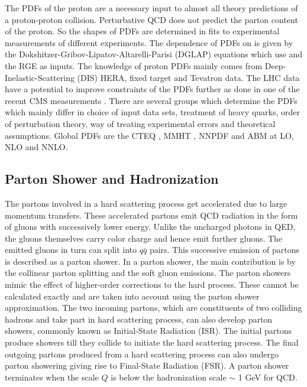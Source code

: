 The PDFs of the proton are a necessary input to almost all theory predictions of a proton-proton collision. Perturbative QCD does not predict the parton content of the proton. So the shapes of PDFs are determined in fits to experimental measurements of different experiments. The dependence of PDFs on \muf is given by the Dokshitzer-Gribov-Lipatov-Altarelli-Parisi (DGLAP) \cite{Gribov:1972ri,Dokshitzer:1977sg,Altarelli:1977zs} equations which use \alps and the RGE as inputs. The knowledge of proton PDFs mainly comes from Deep-Inelastic-Scattering (DIS) HERA, fixed target and Tevatron data. The LHC data have a potential to improve constraints of the PDFs further as done in one of the recent CMS measurements \cite{Sirunyan:2017skj}. There are several groups which determine the PDFs which mainly differ in choice of input data sets, treatment of heavy quarks, order of perturbation theory, way of treating experimental errors and theoretical assumptions. Global PDFs are the CTEQ \cite{Dulat:2015mca}, MMHT \cite{Harland-Lang:2014zoa}, NNPDF \cite{Ball:2014uwa} and ABM \cite{Alekhin:2012ig} at LO, NLO and NNLO.%

\subsection{Parton Shower and Hadronization}
The partons involved in a hard scattering process get accelerated due to large momentum transfers. These accelerated partons emit QCD radiation in the form of gluons with successively lower energy. Unlike the uncharged photons in QED, the gluons themselves carry color charge and hence emit further gluons. The emitted gluons in turn can split into $q\bar{q}$ pairs. This successive emission of partons is described as a parton shower. In a parton shower, the main contribution is by the collinear parton splitting and the soft gluon emissions. The parton showers mimic the effect of higher-order corrections to the hard process. These cannot be calculated exactly and are taken into account using the parton shower approximation. The two incoming partons, which are constituents of two colliding hadrons and take part in hard scattering process, can also develop parton showers, commonly known as Initial-State Radiation (ISR). The initial partons produce showers till they collide to initiate the hard scattering process. The final outgoing partons produced from a hard scattering process can also undergo parton showering giving rise to Final-State Radiation (FSR). A parton shower terminates when the scale $Q$ is below the hadronization scale $\sim$ 1 GeV for QCD.

